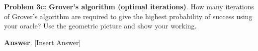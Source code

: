 \textbf{Problem 3c: Grover's algorithm (optimal iterations)}. How many iterations of Grover's algorithm are required to give the highest probability of success using your oracle? 
Use the geometric picture and show your working.


\textbf{Answer}. [Insert Answer]


